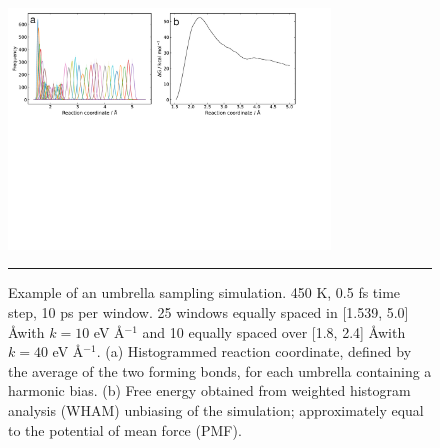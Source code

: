 \documentclass[11pt]{article}
\numberwithin{equation}{subsection}
\begin{document}
\begin{figure}[h!]
	\centering
	\vspace{0.4cm}
	\includegraphics[height=6.4cm]{figSX36.pdf}
	\vspace{0.1cm}
	\hrule
	\vspace{0.1cm}
	\caption{Example of an umbrella sampling simulation. 450 K, 0.5 fs time step, 10 ps per window. 25 windows equally spaced in [1.539, 5.0] \AA with $k = 10$ eV \AA${}^{-1}$ and 10 equally spaced over [1.8, 2.4] \AA with $k = 40$ eV \AA${}^{-1}$. (a) Histogrammed reaction coordinate, defined by the average of the two forming bonds, for each umbrella containing a harmonic bias. (b) Free energy obtained from weighted histogram analysis (WHAM) unbiasing of the simulation; approximately equal to the potential of mean force (PMF).}
	\label{fig::SX36}
\end{figure}


\clearpage
\printbibliography
\end{document}
